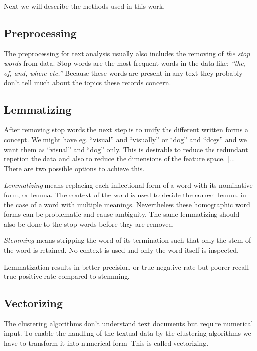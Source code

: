 Next we will describe the methods used in this work.


\subsection{Preprocessing}
The preprocessing for text analysis usually also includes the 
removing of \emph{the stop words} from data. Stop words are the 
most frequent words in the data like: \emph{``the, of, and, where 
etc.''} Because these words are present in any text they probably 
don't tell much about the topics these records concern. 
\cite{ref_here}


\subsection{Lemmatizing}
After removing stop words the next step is to unify the 
different written forms a concept. We might have eg. ``visual'' 
and ``visually'' or ``dog'' and ``dogs'' and we want them as 
``visual'' and ``dog'' only. This is desirable to reduce the 
redundant repetion the data and also to reduce the dimensions of 
the feature space. [...] \cite{ref_here}
There are two possible options to achieve this. 

\emph{Lemmatizing} means replacing each inflectional form of a 
word with its nominative form, or lemma. The context of the word 
is used to decide the correct lemma in the case of a word with 
multiple meanings.   Nevertheless these homographic 
word forms can be problematic and cause ambiguity. The same 
lemmatizing should also be done to the stop words before they are 
removed.

\emph{Stemming} means stripping the word of its termination such 
that only the stem of the word is retained. No context is used 
and only the word itself is inspected.

Lemmatization results in better precision, or true negative rate 
but poorer recall true positive rate compared to stemming. 
\cite{ref_here}


\subsection{Vectorizing}
The clustering algorithms don't understand text documents but 
require numerical input. To enable the handling of the textual 
data by the clustering algorithms we have to transform it into 
numerical form. This is called vectorizing.

